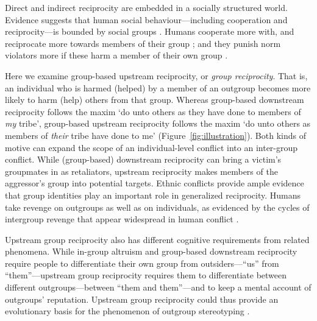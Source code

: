 \documentclass[12pt,a4paper]{article}
\begin{document}
Direct and indirect reciprocity are embedded in a socially structured
world. Evidence suggests that human social behaviour---including cooperation
and reciprocity---is bounded by social groups \citep{tajfel1979integrative,yamagishi2000thegroup,balliet2014ingroup,DeDreu2014}.
Humans cooperate more with, and reciprocate more towards members of
their group \citep{chen2009group,chen2011potential}; and they punish
norm violators more if these harm a member of their own group \citep{bernhard2006group,bernhard2006parochial}.

Here we examine group-based upstream reciprocity, or \emph{group reciprocity}.
That is, an individual who is harmed (helped) by a member of an outgroup
becomes more likely to harm (help) others from that group. Whereas
group-based downstream reciprocity \citep{bernhard2006group,bernhard2006parochial}
follows the maxim `do unto others as they have done to members of
\emph{my} tribe', group-based upstream reciprocity follows the maxim
`do unto others as members of \emph{their} tribe have done to me'
(Figure~\ref{fig:illustration}). Both kinds of motive can expand
the scope of an individual-level conflict into an inter-group conflict.
While (group-based) downstream reciprocity can bring a victim's groupmates
in as retaliators, upstream reciprocity makes members of the aggressor's
group into potential targets. Ethnic conflicts provide ample evidence
that group identities play an important role in generalized reciprocity.
Humans take revenge on outgroups as well as on individuals, as evidenced
by the cycles of intergroup revenge that appear widespread in human
conflict \citep{horowitz2001thedeadly,horowitz1985ethnicgroups,chagnon1988lifehistories,shayo2010judicial}.
 

Upstream group reciprocity also has different cognitive requirements
from related phenomena. While in-group altruism and group-based downstream
reciprocity require people to differentiate their own group from outsiders---``us''
from ``them''---upstream group reciprocity requires them to differentiate
between different outgroups---between ``them and them''---and to
keep a mental account of outgroups' reputation. Upstream group reciprocity
could thus provide an evolutionary basis for the phenomenon of outgroup
stereotyping .
\end{document}

